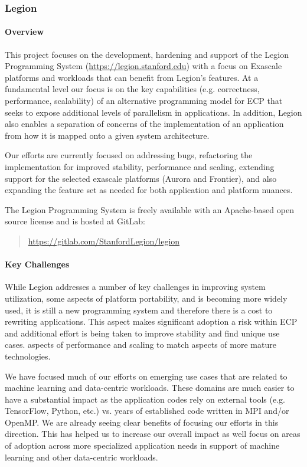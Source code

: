 \subsubsection{ Legion}

\paragraph{Overview}
This project focuses on the development, hardening and support of the
Legion Programming System (\url{https://legion.stanford.edu}) with a
focus on Exascale platforms and workloads that can benefit from
Legion's features.  At a fundamental level our focus is on the key
capabilities (e.g. correctness, performance, scalability) of an
alternative programming model for ECP that seeks to expose additional
levels of parallelism in applications.  In addition, Legion also
enables a separation of concerns of the implementation of an
application from how it is mapped onto a given system architecture.

Our efforts are currently focused on addressing bugs, refactoring the
implementation for improved stability, performance and scaling,
extending support for the selected exascale platforms (Aurora and
Frontier), and also expanding the feature set as needed for both
application and platform nuances.

The Legion Programming System is freely available with an Apache-based
open source license and is hosted at GitLab:

\begin{quote} 
  \url{https://gitlab.com/StanfordLegion/legion}
\end{quote}

\paragraph{Key Challenges}
While Legion addresses a number of key challenges in improving system
utilization, some aspects of platform portability, and is becoming
more widely used, it is still a new programming system and therefore
there is a cost to rewriting applications.  This aspect makes
significant adoption a risk within ECP and additional effort is being
taken to improve stability and find unique use cases.  aspects of performance and scaling to
match aspects of more mature technologies.

We have focused much of our efforts on emerging use cases that are
related to machine learning and data-centric workloads.  These domains
are much easier to have a substantial impact as the application codes
rely on external tools (e.g. TensorFlow, Python, etc.) vs. years of
established code written in MPI and/or OpenMP.  We are already seeing
clear benefits of focusing our efforts in this direction. This has
helped us to increase our overall impact as well focus on areas of
adoption across more specialized application needs in support of
machine learning and other data-centric workloads.

